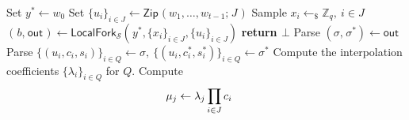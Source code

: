 \documentclass[psamsfonts, reqno]{amsart}
\theoremstyle{definition}
\theoremstyle{remark}
\numberwithin{equation}{section}
\begin{document}
\begin{minipage}{0.97\textwidth}
\begin{algorithm}[H]
    \centering
    \caption{$\mathcal{A}^*\hspace{1pt}(
    	w_0, w_1, \dots, w_{t-1})$}\label{omdl_attacker}
    \begin{algorithmic}[1]
    	\vspace{4pt}
    	\State
    		Set $y^* \leftarrow w_0$
    		\vspace{6pt}
    	\State
    		Set $\{u_i\}_{i \in J} \leftarrow
    		\mathsf{Zip}\hspace{1pt}(w_1, \dots, w_{t-1};
    		\hspace{1pt}J\hspace{1pt})$
    		\vspace{6pt}
    	\State
    		Sample $x_i \leftarrow_\$ \mathbb{Z}_q,\ i \in J$
    		\vspace{6pt}
    	\State
    		$(\hspace{1pt}b,\hspace{1pt} \mathsf{out}\hspace{1pt})
    		\leftarrow \mathsf{LocalFork_{\mathcal{S}}}(
    			\hspace{1pt}
    			y^*,
    			\{x_i\}_{i \in J},
    			\{u_i\}_{i \in J}
    		)$
    		\vspace{6pt}
    	\vspace{3pt}
			\State
				\textbf{return $\bot$}\vspace{4pt}
		\EndIf
		\State
			Parse $(\hspace{0pt}
				\sigma,\hspace{1pt}
				\sigma^*
			\hspace{0pt}) \leftarrow \mathsf{out}$
			\vspace{6pt}
		\State
    		Parse $\{(u_i, c_i, s_i)\}_{i \in Q}
    		\leftarrow \sigma,
    		\ \{(u_i, c_i^*, s_i^*)\}_{i \in Q}
    		\leftarrow \sigma^*$
    		\vspace{6pt}
    	\State
    		Compute the interpolation coefficients
    		$\{\lambda_i\}_{i \in Q}$ for $Q$.
    		\vspace{6pt}
    	\State
    		Compute
    		\begin{equation*}
    			\hspace{-12pt}\mu_j \leftarrow \lambda_j
    			\prod_{i \in J} c_i
    		\end{equation*}
    		\vspace{-5pt}
    		\vspace{8pt}

\end{algorithmic}
\end{algorithm}
\end{minipage}
\end{document}
